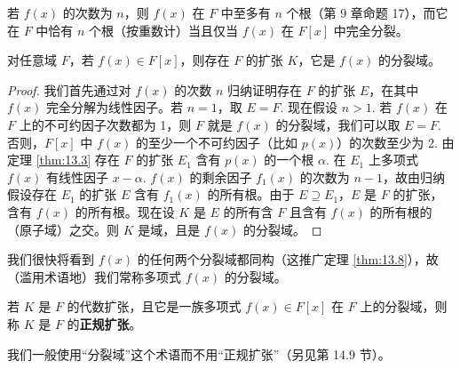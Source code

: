 若 \(f(x)\) 的次数为 \(n\)，则 \(f(x)\) 在 \(F\) 中至多有 \(n\) 个根（第 9 章命题 17），而它在 \(F\) 中恰有 \(n\) 个根（按重数计）当且仅当 \(f(x)\) 在 \(F[x]\) 中完全分裂。

\begin{theorem}\label{thm:13.25}
对任意域 \(F\)，若 \(f(x) \in F[x]\)，则存在 \(F\) 的扩张 \(K\)，它是 \(f(x)\) 的分裂域。
\end{theorem}

\begin{proof}
我们首先通过对 \(f(x)\) 的次数 \(n\) 归纳证明存在 \(F\) 的扩张 \(E\)，在其中 \(f(x)\) 完全分解为线性因子。若 \(n = 1\)，取 \(E = F\). 现在假设 \(n > 1\). 若 \(f(x)\) 在 \(F\) 上的不可约因子次数都为 1，则 \(F\) 就是 \(f(x)\) 的分裂域，我们可以取 \(E = F\). 否则，\(F[x]\) 中 \(f(x)\) 的至少一个不可约因子（比如 \(p(x)\)）的次数至少为 2. 由定理 \ref{thm:13.3} 存在 \(F\) 的扩张 \(E_1\) 含有 \(p(x)\) 的一个根 \(\alpha\). 在 \(E_1\) 上多项式 \(f(x)\) 有线性因子 \(x-\alpha\). \(f(x)\) 的剩余因子 \(f_1(x)\) 的次数为 \(n-1\)，故由归纳假设存在 \(E_1\) 的扩张 \(E\) 含有 \(f_1(x)\) 的所有根。由于 \(E \supseteq E_1\)，\(E\) 是 \(F\) 的扩张，含有 \(f(x)\) 的所有根。现在设 \(K\) 是 \(E\) 的所有含 \(F\) 且含有 \(f(x)\) 的所有根的（原子域）之交。则 \(K\) 是域，且是 \(f(x)\) 的分裂域。
\end{proof}

我们很快将看到 \(f(x)\) 的任何两个分裂域都同构（这推广定理 \ref{thm:13.8}），故（滥用术语地）我们常称多项式 \(f(x)\) 的分裂域。

\begin{definition}
若 \(K\) 是 \(F\) 的代数扩张，且它是一族多项式 \(f(x) \in F[x]\) 在 \(F\) 上的分裂域，则称 \(K\) 是 \(F\) 的\textbf{正规扩张}。
\end{definition}

我们一般使用“分裂域”这个术语而不用“正规扩张”（另见第 14.9 节）。

